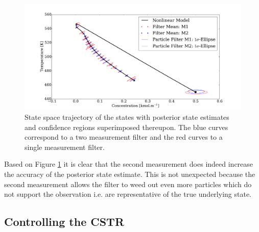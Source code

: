 \documentclass[../masters.tex]{subfiles}
\begin{document}
\begin{figure}[H] 
\centering
\includegraphics[scale=0.3]{spf_m1_m2.pdf}
\caption{State space trajectory of the states with posterior state estimates and confidence regions superimposed thereupon. The blue curves correspond to a two measurement filter and the red curves to a single measurement filter.}
\label{fig_spf_m1_m2}
\end{figure}
Based on Figure \ref{fig_spf_m1_m2} it is clear that the second measurement does indeed increase the accuracy of the posterior state estimate. This is not unexpected because the second measurement allows the filter to weed out even more particles which do not support the observation i.e. are representative of the true underlying state.





\subsection{Controlling the CSTR}



\end{document}
